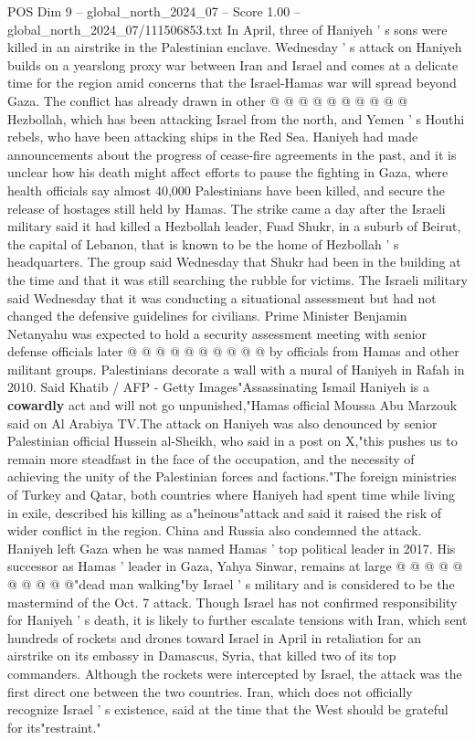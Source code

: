 \begin{textsample}{POS Dim 9 – global\_north\_2024\_07 – Score 1.00 – global\_north\_2024\_07/111506853.txt}
In April, three of Haniyeh ' s sons were killed in an airstrike in the Palestinian enclave.
Wednesday ' s attack on Haniyeh builds on a yearslong proxy war between Iran and Israel and comes at a delicate time for the region amid concerns that the Israel-Hamas war will spread beyond Gaza.
The conflict has already drawn in other @ @ @ @ @ @ @ @ @ @ Hezbollah, which has been attacking Israel from the north, and Yemen ' s Houthi rebels, who have been attacking ships in the Red Sea.
Haniyeh had made announcements about the progress of cease-fire agreements in the past, and it is unclear how his death might affect efforts to pause the fighting in Gaza, where health officials say almost 40,000 Palestinians have been killed, and secure the release of hostages still held by Hamas.
The strike came a day after the Israeli military said it had killed a Hezbollah leader, Fuad Shukr, in a suburb of Beirut, the capital of Lebanon, that is known to be the home of Hezbollah ' s headquarters.
The group said Wednesday that Shukr had been in the building at the time and that it was still searching the rubble for victims.
The Israeli military said Wednesday that it was conducting a situational assessment but had not changed the defensive guidelines for civilians.
Prime Minister Benjamin Netanyahu was expected to hold a security assessment meeting with senior defense officials later @ @ @ @ @ @ @ @ @ @ by officials from Hamas and other militant groups.
Palestinians decorate a wall with a mural of Haniyeh in Rafah in 2010.
Said Khatib / AFP - Getty Images"Assassinating Ismail Haniyeh is a \textbf{cowardly} act and will not go unpunished,"Hamas official Moussa Abu Marzouk said on Al Arabiya TV.The attack on Haniyeh was also denounced by senior Palestinian official Hussein al-Sheikh, who said in a post on X,"this pushes us to remain more steadfast in the face of the occupation, and the necessity of achieving the unity of the Palestinian forces and factions."The foreign ministries of Turkey and Qatar, both countries where Haniyeh had spent time while living in exile, described his killing as a"heinous"attack and said it raised the risk of wider conflict in the region.
China and Russia also condemned the attack.
Haniyeh left Gaza when he was named Hamas ' top political leader in 2017.
His successor as Hamas ' leader in Gaza, Yahya Sinwar, remains at large @ @ @ @ @ @ @ @ @ @"dead man walking"by Israel ' s military and is considered to be the mastermind of the Oct. 7 attack.
Though Israel has not confirmed responsibility for Haniyeh ' s death, it is likely to further escalate tensions with Iran, which sent hundreds of rockets and drones toward Israel in April in retaliation for an airstrike on its embassy in Damascus, Syria, that killed two of its top commanders.
Although the rockets were intercepted by Israel, the attack was the first direct one between the two countries.
Iran, which does not officially recognize Israel ' s existence, said at the time that the West should be grateful for its"restraint."

\end{textsample}
